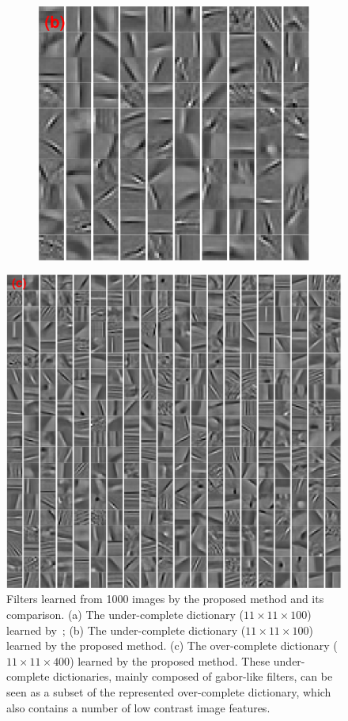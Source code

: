 \begin{figure}[h]
\begin{minipage}{0.4\textwidth}
\begin{subfigure}{1\textwidth}
    \centering
  \includegraphics[width=0.6\linewidth]{figure/online100-filter.pdf}
\end{subfigure}
\end{minipage}
\begin{minipage}{0.5\textwidth}
\centering
\includegraphics[width=1\linewidth]{figure/online400-filter.pdf}
\end{minipage}

\caption{Filters learned from 1000 images by the proposed method and its comparison. (a) The under-complete dictionary ($11 \times 11 \times 100$) learned by~\cite{liu-2018-first}; (b) The under-complete dictionary ($11 \times 11 \times 100$) learned by the proposed method. (c) The over-complete dictionary ($11 \times 11 \times 400$) learned by the proposed method. These under-complete dictionaries, mainly composed of gabor-like filters, can be seen as a subset of the represented over-complete dictionary, which also contains a number of low contrast image features.}
\label{fig:overCompleteDic}
\end{figure}

